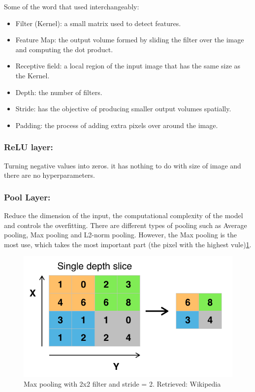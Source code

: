 \documentclass[12pt]{report}
\begin{document}
        Some of the word that used interchangeably:
        \begin{itemize}
            \item Filter (Kernel): a small matrix used to detect features.
            \item Feature Map: the output volume formed by sliding the filter over the image and computing the dot product.
            \item Receptive field: a local region of the input image that has the same size as the Kernel.
            \item Depth: the number of filters.
            \item Stride: has the objective of producing smaller output volumes spatially.
            \item Padding: the process of adding extra pixels over around the image.
        \end{itemize}

    \subsubsection{ReLU layer:}
        Turning negative values into zeros. it has nothing to do with size of image and there are no hyperparameters.
    \subsubsection{Pool Layer:}
        Reduce the dimension of the input, the computational complexity of the model and 
        controls the overfitting. There are different types of pooling such as Average pooling, Max pooling and L2-norm pooling.
        However, the Max pooling is the most use, which takes the most important part (the pixel with the highest vule)\ref{fig:pool}. 
        
            \begin{figure}[h]
                \centering
                \includegraphics[width=.8\textwidth]{./images/pool.png}
                \caption{Max pooling with 2x2 filter and stride = 2. Retrieved: Wikipedia}
                \label{fig:pool}
            \end{figure}
\end{document}
